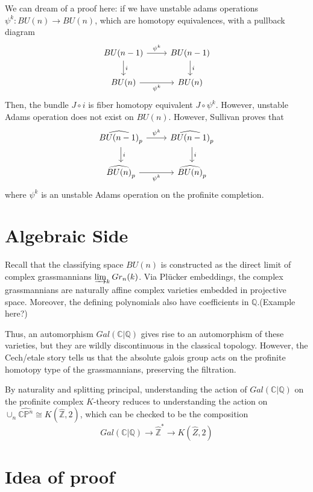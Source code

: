 \documentclass{article}
\theoremstyle{definition}
\theoremstyle{definition}
\theoremstyle{definition}
\theoremstyle{definition}
\theoremstyle{definition}
\theoremstyle{definition}
\theoremstyle{definition}
\begin{document}
We can dream of a proof here: if we have unstable adams operations $\psi^k: BU(n)\to BU(n)$, which are homotopy equivalences, with a pullback diagram
\[\begin{tikzcd}
	{BU(n-1)} & {BU(n-1)} \\
	{BU(n)} & {BU(n)}
	\arrow["{\psi^k}", from=1-1, to=1-2]
	\arrow["i", from=1-1, to=2-1]
	\arrow["i", from=1-2, to=2-2]
	\arrow["{\psi^k}"', from=2-1, to=2-2]
\end{tikzcd}\]
Then, the bundle $J\circ i$ is fiber homotopy equivalent $J\circ \psi^k$. However, unstable Adams operation does not exist on $BU(n)$. However, Sullivan proves that 
\[\begin{tikzcd}
	{\widehat{BU(n-1)}_p} & {\widehat{BU(n-1)}_p} \\
	{\widehat{BU(n)}_p} & {\widehat{BU(n)}_p}
	\arrow["{\psi^k}", from=1-1, to=1-2]
	\arrow["i", from=1-1, to=2-1]
	\arrow["i", from=1-2, to=2-2]
	\arrow["{\psi^k}"', from=2-1, to=2-2]
\end{tikzcd}\]
where $\psi^k$ is an unstable Adams operation on the profinite completion. 







\section{Algebraic Side}

Recall that the classifying space $BU(n)$ is constructed as the direct limit of complex grassmannians $\varinjlim_{k}Gr_n(k)$. Via Pl\"{u}cker embeddings, the complex grassmannians are naturally affine complex varieties embedded in projective space. Moreover, the defining polynomials also have coefficients in $\mathbb{Q}$.(Example here?)

Thus, an automorphism $Gal(\mathbb{C}|\mathbb{Q})$ gives rise to an automorphism of these varieties, but they are wildly discontinuous in the classical topology. However, the Cech/etale story tells us that the absolute galois group acts on the profinite homotopy type of the grassmannians, preserving the filtration. 

By naturality and splitting principal, understanding the action of $Gal(\mathbb{C}|\mathbb{Q})$ on the profinite complex $K$-theory reduces to understanding the action on $\cup_n \widehat{\mathbb{CP}^n}\cong K(\widehat{\mathbb{Z}},2)$, which can be checked to be the composition 
\[Gal(\mathbb{C}|\mathbb{Q})\to \widehat{\mathbb{Z}}^*\to K(\widehat{Z},2)\]


\section*{Idea of proof}
\end{document}
